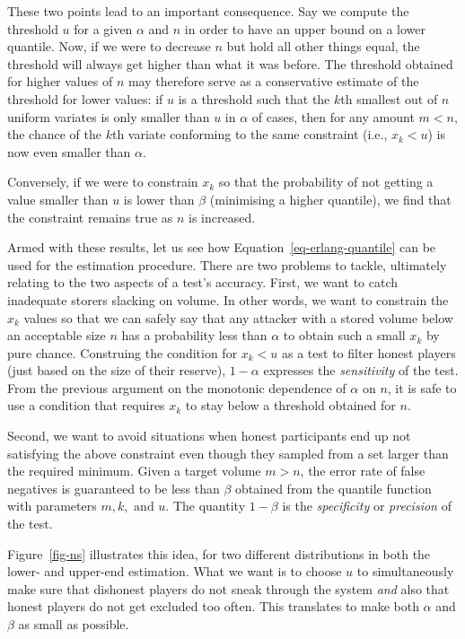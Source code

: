 These two points lead to an important consequence. Say we compute the
threshold $u$ for a given $\alpha$ and $n$ in order to have an upper bound on a lower quantile. Now, if we were to
decrease $n$ but hold all other things equal, the threshold will
always get higher than what it was before. The threshold obtained for
higher values of $n$ may therefore serve as a conservative estimate of
the threshold for lower values: if $u$ is a threshold such that the
$k$th smallest out of $n$ uniform variates is only smaller than $u$ in
$\alpha$ of cases, then for any amount $m<n$, the chance of the
$k$th variate conforming to the same constraint (i.e., $x_k<u$) is now even smaller than $\alpha$. 

Conversely, if we were to constrain $x_k$ so that the probability of not getting a value smaller than $u$ is lower than $\beta$ (minimising a higher quantile), we find that the constraint remains true as $n$ is increased.

Armed with these results, let us see how
Equation~\ref{eq-erlang-quantile} can be used for the estimation
procedure.  
There are two problems to tackle, ultimately relating to the two aspects of a test's accuracy. First, we want to catch inadequate storers slacking on volume. In other words, we want to constrain the $x_k$ values so that we can safely say that any attacker with a stored volume below an acceptable size $n$ has a probability less than $\alpha$ to obtain such a small $x_k$ by pure chance. Construing the condition for $x_k<u$ as a test to filter honest players (just based on the size of their reserve), $1-\alpha$ expresses the \emph{sensitivity} of the test.
From the previous argument on the monotonic dependence of $\alpha$ on $n$, it is safe to use a condition that requires $x_k$ to stay below a threshold obtained for $n$. 

Second, we want to avoid situations when honest participants end up not satisfying the above constraint even though they sampled from a set larger than the required minimum. Given a target volume $m>n$, the error rate of false negatives is guaranteed to be less than $\beta$ obtained from the quantile function with parameters $m, k, \text{ and }u$. The quantity $1-\beta$ is the \emph{specificity} or \emph{precision}
of the test.



Figure~\ref{fig-ns} illustrates this
idea, for two different distributions in both the lower- and upper-end
estimation. What we want is to choose $u$ to simultaneously make sure
that dishonest players do not sneak through the system \emph{and} also that
honest players do not get excluded too often. This translates to make both $\alpha$
and $\beta$ as small as possible. 


